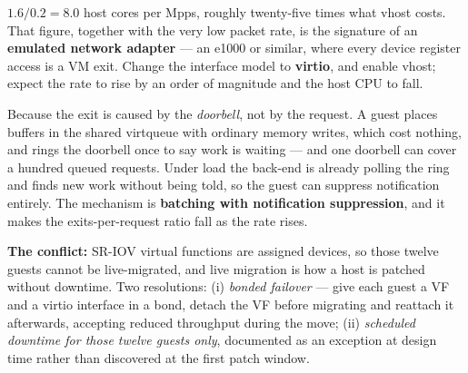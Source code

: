 \begin{ans}
  \item $1.6/0.2 = \mathbf{8.0}$ host cores per Mpps, roughly twenty-five times
        what vhost costs. That figure, together with the very low packet rate,
        is the signature of an \textbf{emulated network adapter} --- an e1000 or
        similar, where every device register access is a VM exit. Change the
        interface model to \textbf{virtio}, and enable vhost; expect the rate to
        rise by an order of magnitude and the host CPU to fall.
  \item Because the exit is caused by the \emph{doorbell}, not by the request. A
        guest places buffers in the shared virtqueue with ordinary memory
        writes, which cost nothing, and rings the doorbell once to say work is
        waiting --- and one doorbell can cover a hundred queued requests. Under
        load the back-end is already polling the ring and finds new work without
        being told, so the guest can suppress notification entirely. The
        mechanism is \textbf{batching with notification suppression}, and it
        makes the exits-per-request ratio fall as the rate rises.
  \item \textbf{The conflict:} SR-IOV virtual functions are assigned devices, so
        those twelve guests cannot be live-migrated, and live migration is how
        a host is patched without downtime. Two resolutions:
        (i) \emph{bonded failover} --- give each guest a VF and a virtio
        interface in a bond, detach the VF before migrating and reattach it
        afterwards, accepting reduced throughput during the move;
        (ii) \emph{scheduled downtime for those twelve guests only}, documented
        as an exception at design time rather than discovered at the first
        patch window.
\end{ans}

